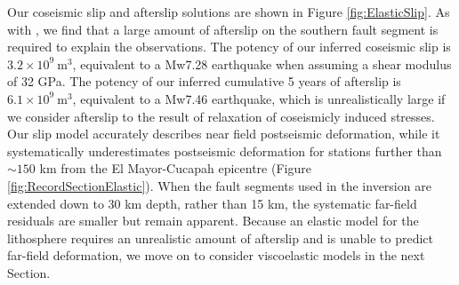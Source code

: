 \documentclass[review]{elsarticle}
\begin{document}
Our coseismic slip and afterslip solutions are shown in Figure \ref{fig:ElasticSlip}.  As with \citet{Rollins2015}, we find that a large amount of afterslip on the southern fault segment is required to explain the observations. The potency of our inferred coseismic slip is $3.2\times10^9\ \mathrm{m}^3$, equivalent to a Mw7.28 earthquake when assuming a shear modulus of 32 GPa.  The potency of our inferred cumulative 5 years of afterslip is $6.1\times10^9\ \mathrm{m}^3$, equivalent to a Mw7.46 earthquake, which is unrealistically large if we consider afterslip to the result of relaxation of coseismicly induced stresses.  Our slip model accurately describes near field postseismic deformation, while it systematically underestimates postseismic deformation for stations further than $\sim150$ km from the El Mayor-Cucapah epicentre (Figure \ref{fig:RecordSectionElastic}).  When the fault segments used in the inversion are extended down to 30 km depth, rather than 15 km, the systematic far-field residuals are smaller but remain apparent. Because an elastic model for the lithosphere requires an unrealistic amount of afterslip and is unable to predict far-field deformation, we move on to consider viscoelastic models in the next Section.  
\end{document}
